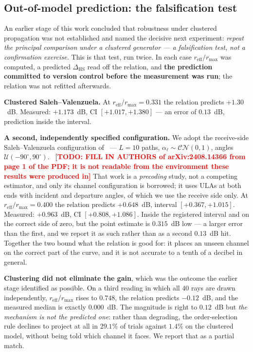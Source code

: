 \documentclass[journal]{IEEEtran}
\newcommand{\todo}[1]{\textcolor{red}{\textbf{[TODO: #1]}}}
\newcommand{\CN}{\mathcal{CN}}
\newcommand{\reff}{r_{\mathrm{eff}}}
\newcommand{\rmax}{r_{\max}}
\newcommand{\dhs}{\Delta_{\mathrm{HS}}}
\begin{document}
\subsection{Out-of-model prediction: the falsification test}
\label{sec:oom}

An earlier stage of this work concluded that robustness under clustered
propagation was not established and named the decisive next experiment:
\emph{repeat the principal comparison under a clustered generator --- a
falsification test, not a confirmation exercise.} This is that test, run twice.
In each case $\reff/\rmax$ was computed, a predicted $\dhs$ read off the
relation, and \textbf{the prediction committed to version control before the
measurement was run}; the relation was not refitted afterwards.

\textbf{Clustered Saleh--Valenzuela.} At $\reff/\rmax=0.331$ the relation
predicts $+1.30$~dB. Measured:
$+1.173$~dB, CI $[+1.017,+1.380]$ --- an error of $0.13$~dB, prediction inside
the interval.

\textbf{A second, independently specified configuration.} We adopt the
receive-side Saleh--Valenzuela configuration of~\cite{precoding2408} --- $L=10$
paths, $\alpha_\ell\sim\CN(0,1)$, angles $\mathcal{U}(-90^\circ,90^\circ)$.~%
\todo{FILL IN AUTHORS of arXiv:2408.14366 from page 1 of the PDF; it is not
readable from the environment these results were produced in} That work is a
\emph{precoding} study, not a competing estimator, and only its channel
configuration is borrowed; it uses ULAs at both ends with incident and
departure angles, of which we use the receive side only. At
$\reff/\rmax=0.400$ the relation predicts $+0.648$~dB, interval
$[+0.367,+1.015]$. Measured: $+0.963$~dB, CI $[+0.808,+1.086]$. Inside the
registered interval and on the correct side of zero, but the point estimate is
$0.315$~dB low --- a larger error than the first, and we report it as such
rather than as a second $0.13$~dB hit. Together the two bound what the relation
is good for: it places an unseen channel on the correct part of the curve, and
it is not accurate to a tenth of a decibel in general.

\textbf{Clustering did not eliminate the gain}, which was the outcome the
earlier stage identified as possible. On a third reading in which all $40$ rays
are drawn independently, $\reff/\rmax$ rises to $0.748$, the relation predicts
$-0.12$~dB, and the measured median is exactly $0.000$~dB. The magnitude is
right to $0.12$~dB but \emph{the mechanism is not the predicted one}: rather
than degrading, the order-selection rule declines to project at all in
$29.1\%$ of trials against $1.4\%$ on the clustered model, without being told
which channel it faces. We report that as a partial match.
\end{document}
